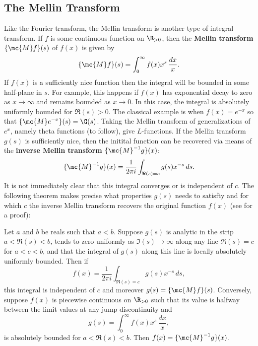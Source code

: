       \subsection*{The Mellin Transform}
        Like the Fourier transform, the Mellin transform is another type of integral transform. If $f$ is some continuous function on $\R_{>0}$, then the \textbf{Mellin transform} $\{\mc{M}f\}(s)$ of $f(x)$ is given by
        \[
          \{\mc{M}f\}(s) = \int_{0}^{\infty}f(x)x^{s}\,\frac{dx}{x}.
        \]
        If $f(x)$ is a sufficiently nice function then the integral will be bounded in some half-plane in $s$. For example, this happens if $f(x)$ has exponential decay to zero as $x \to \infty$ and remains bounded as $x \to 0$. In this case, the integral is absolutely uniformly bounded for $\Re(s) > 0$. The classical example is when $f(x) = e^{-x}$ so that $\{\mc{M}e^{-x}\}(s) = \G(s)$. Taking the Mellin transform of generalizations of $e^{x}$, namely theta functions (to follow), give $L$-functions. If the Mellin transform $g(s)$ is sufficiently nice, then the initital function can be recovered via means of the \textbf{inverse Mellin transform} $\{\mc{M}^{-1}g\}(x)$:
        \[
          \{\mc{M}^{-1}g\}(x) = \frac{1}{2\pi i}\int_{\Re(s) = c}g(s)x^{-s}\,ds.
        \]
        It is not immediately clear that this integral converges or is independent of $c$. The following theorem makes precise what properties $g(s)$ needs to satisfty and for which $c$ the inverse Mellin transform recovers the original function $f(x)$ (see \cite{debnath2002integral} for a proof):

        \begin{theorem}
          Let $a$ and $b$ be reals such that $a < b$. Suppose $g(s)$ is analytic in the strip $a < \Re(s) < b$, tends to zero uniformly as $\Im(s) \to \infty$ along any line $\Re(s) = c$ for $a < c < b$, and that the integral of $g(s)$ along this line is locally absolutely uniformly bounded. Then if
          \[
            f(x) = \frac{1}{2\pi i}\int_{\Re(s) = c}g(s)x^{-s}\,ds,
          \]
          this integral is independent of $c$ and moreover $g(s) = \{\mc{M}f\}(s)$. Conversely, suppose $f(x)$ is piecewise continuous on $\R_{>0}$ such that its value is halfway between the limit values at any jump discontinuity and
          \[
            g(s) = \int_{0}^{\infty}f(x)x^{s}\,\frac{dx}{x},
          \]
          is absolutely bounded for $a < \Re(s) < b$. Then $f(x) = \{\mc{M}^{-1}g\}(x)$.
        \end{theorem}
